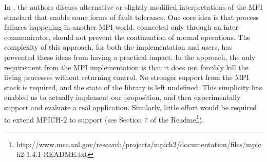 In %
\cite{Gropp:2004:FTM:1080704.1080714}, the authors discuss alternative
or slightly modified interpretations of the MPI standard that enable
some forms of fault tolerance. 
One core idea is that process failures happening in another MPI world, connected only through an inter-communicator, should not prevent the continuation of normal operations. The complexity of this approach, for both the implementation
and users, has prevented these ideas from having a practical impact. In the \cof
approach, the only requirement from the MPI implementation is that it does not
forcibly kill the living processes without returning control. No
stronger support from the MPI stack is required, and the state of the
library is left undefined. This simplicity
has enabled us to actually implement our proposition, and then experimentally support and
evaluate a real \abft application. Similarly, little effort would be required to extend 
MPICH-2 to support \cof (see Section 7 of the Readme\footnote{http://www.mcs.anl.gov/research/projects/mpich2/documentation/files/mpich2-1.4.1-README.txt}).

